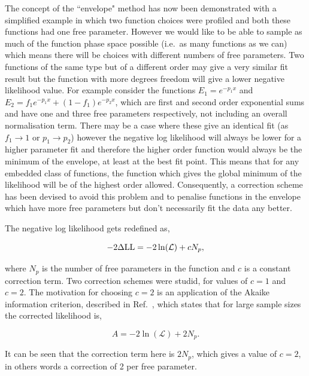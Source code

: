 The concept of the ``envelope" method has now been demonstrated with a simplified example in which two function choices were profiled and both these functions had one free parameter. However we would like to be able to sample as much of the function phase space possible (i.e.~as many functions as we can) which means there will be choices with different numbers of free parameters. Two functions of the same type but of a different order may give a very similar fit result but the function with more degrees freedom will give a lower negative likelihood value. For example consider the functions $E_{1} = e^{-p_{1}x}$ and $E_{2} = f_{1}e^{-p_{1}x}+(1-f_{1})e^{-p_{2}x}$, which are first and second order exponential sums and have one and three free parameters respectively, not including an overall normalisation term. There may be a case where these give an identical fit (as $f_{1}\to 1$ or $p_{1}\to p_{2}$) however the negative log likelihood will always be lower for a higher parameter fit and therefore the higher order function would always be the minimum of the envelope, at least at the best fit point. This means that for any embedded class of functions, the function which gives the global minimum of the likelihood will be of the highest order allowed. Consequently, a correction scheme has been devised to avoid this problem and to penalise functions in the envelope which have more free parameters but don't necessarily fit the data any better.

The negative log likelihood gets redefined as,

\begin{equation}
  -2\Delta\mathrm{LL} = -2\ln(\mathcal{L}) + cN_{p},
\end{equation}

where $N_{p}$ is the number of free parameters in the function and $c$ is a constant correction term. Two correction schemes were studid, for values of $c=1$ and $c=2$. The motivation for choosing $c=2$ is an application of the Akaike information criterion, described in Ref.~\cite{akaike}, which states that for large sample sizes the corrected likelihood is,

\begin{equation}
  A = -2\ln(\mathcal{L}) + 2N_{p}.
\end{equation}

It can be seen that the correction term here is $2N_{p}$, which gives a value of $c=2$, in others words a correction of 2 per free parameter. 

